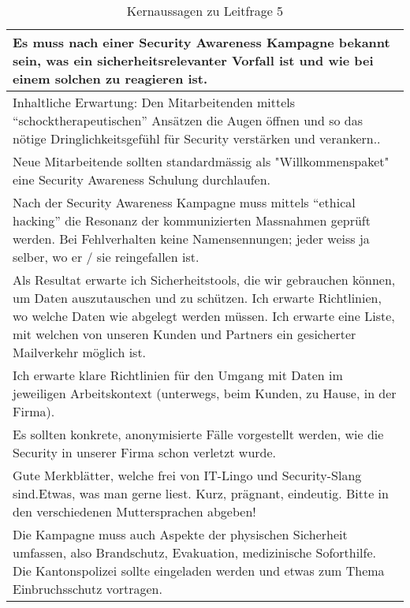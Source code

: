 \documentclass[../../main.tex]{subfiles}
\begin{document}
\begin{table}[H]
\tablefontsize	
\caption{Kernaussagen zu Leitfrage 5}
\label{kernaussagen_leitfrage5}


\begin{tabular}{ |p{\textwidth-1cm}| }



\hline
Es muss nach einer Security Awareness Kampagne bekannt sein, was ein sicherheitsrelevanter Vorfall ist und wie bei einem solchen zu reagieren ist.\\ 
\hline
Inhaltliche Erwartung: Den Mitarbeitenden mittels "`schocktherapeutischen"' Ansätzen die Augen öffnen und so das nötige Dringlichkeitsgefühl für Security verstärken und verankern..\\
\hline
Neue Mitarbeitende sollten standardmässig als "Willkommenspaket" eine Security Awareness Schulung durchlaufen. \\ 
\hline
Nach der Security Awareness Kampagne muss mittels "`ethical hacking"' die Resonanz der kommunizierten Massnahmen geprüft werden.  Bei Fehlverhalten keine Namensennungen; jeder weiss ja selber, wo er / sie reingefallen ist. \\ 
\hline
Als Resultat erwarte ich Sicherheitstools, die wir gebrauchen können, um Daten auszutauschen und zu schützen. Ich erwarte Richtlinien, wo welche Daten wie abgelegt werden müssen. Ich erwarte eine Liste, mit welchen von unseren Kunden und Partners ein gesicherter Mailverkehr möglich ist.\\ 
\hline
Ich erwarte klare Richtlinien für den Umgang mit Daten im jeweiligen Arbeitskontext (unterwegs, beim Kunden, zu Hause, in der Firma). \\ 
\hline
Es sollten konkrete, anonymisierte Fälle vorgestellt werden, wie die Security in unserer Firma schon verletzt wurde. \\ 
\hline
Gute Merkblätter, welche frei von IT-Lingo und Security-Slang sind.Etwas, was man gerne liest. Kurz, prägnant, eindeutig. Bitte in den verschiedenen Muttersprachen abgeben! \\ 
\hline
Die Kampagne muss auch Aspekte der physischen Sicherheit umfassen, also Brandschutz, Evakuation, medizinische Soforthilfe. Die Kantonspolizei sollte eingeladen werden und etwas zum Thema Einbruchsschutz vortragen. \\ 
\hline

\end{tabular}
\end{table}
\end{document}
